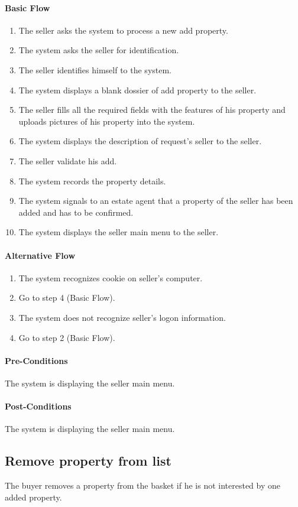 \documentclass[a4paper,12pt]{article}
\begin{document}
\paragraph{Basic Flow}
\begin{enumerate}
\item The seller asks the system to process a new add property.
\item The system asks the seller for identification.
\item The seller identifies himself to the system.
\item The system displays a blank dossier of add property to the seller.
\item The seller fills all the required fields with the features of his property and uploads pictures of his property into the system.
\item The system displays the description of request's seller to the seller.
\item The seller validate his add.
\item The system records the property details.
\item The system signals to an estate agent that a property of the seller has been added and has to be confirmed.
\item The system displays the seller main menu to the seller.
\end{enumerate}
\paragraph{Alternative Flow}
\begin{enumerate}
\item The system recognizes cookie on seller's computer. 
\item Go to step 4 (Basic Flow).
\item The system does not recognize seller's logon information.
\item Go to step 2 (Basic Flow).
\end{enumerate}
\paragraph{Pre-Conditions}
The system is displaying the seller main menu.
\paragraph{Post-Conditions}
The system is displaying the seller main menu.

\subsection{Remove property from list}
The buyer removes a property from the basket if he is not interested by one added property.
\end{document}
